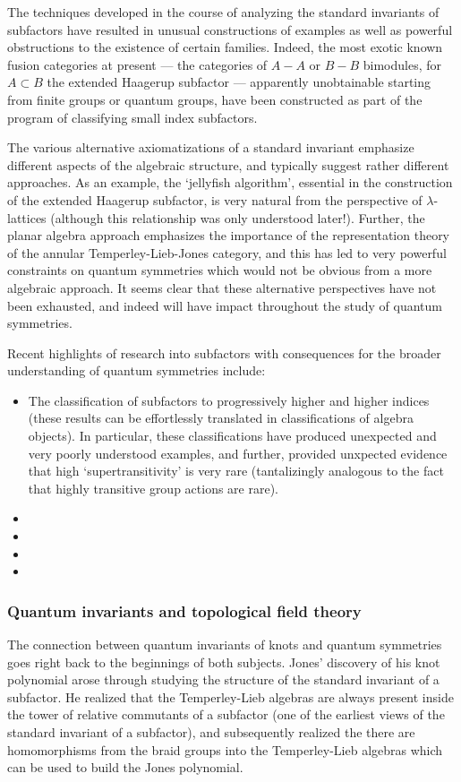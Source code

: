 \documentclass[11pt]{article}
\begin{document}
The techniques developed in the course of analyzing the standard invariants of
subfactors have resulted in unusual constructions of examples as well as
powerful obstructions to the existence of certain families. Indeed, the most
exotic known fusion categories at present --- the categories of $A-A$ or $B-B$
bimodules, for $A \subset B$ the extended Haagerup subfactor --- apparently
unobtainable starting from finite groups or quantum groups, have been
constructed as part of the program of classifying small index subfactors.

The various alternative axiomatizations of a standard invariant emphasize
different aspects of the algebraic structure, and typically suggest rather
different approaches. As an example, the `jellyfish algorithm', essential in
the construction of the extended Haagerup subfactor, is very natural from the
perspective of $\lambda$-lattices (although this relationship was only
understood later!). Further, the planar algebra approach emphasizes the
importance of the representation theory of the annular Temperley-Lieb-Jones
category, and this has led to very powerful constraints on quantum symmetries
which would not be obvious from a more algebraic approach. It seems clear that
these alternative perspectives have not been exhausted, and indeed will have
impact throughout the study of quantum symmetries.

Recent highlights of research into subfactors with consequences for the broader understanding of quantum symmetries include:
\begin{itemize}
\item The classification of subfactors to progressively higher and higher indices (these results can be effortlessly translated in classifications of algebra objects). In particular, these classifications have produced unexpected and very poorly understood examples, and further, provided unxpected evidence that high `supertransitivity' is very rare (tantalizingly analogous to the fact that highly transitive group actions are rare).
\item {}
\item {}
\item {}
\item {}
\end{itemize}


\subsubsection{Quantum invariants and topological field theory}
The connection between quantum invariants of knots and quantum symmetries goes right back to the beginnings of both subjects. Jones' discovery of his knot polynomial arose through studying the structure of the standard invariant of a subfactor. He
realized that the Temperley-Lieb algebras are always present inside the tower of relative commutants of a subfactor (one of the earliest views of the standard invariant of a subfactor),
and subsequently realized the there are homomorphisms from the braid groups into the Temperley-Lieb algebras which can be used to build the Jones polynomial.
\end{document}
